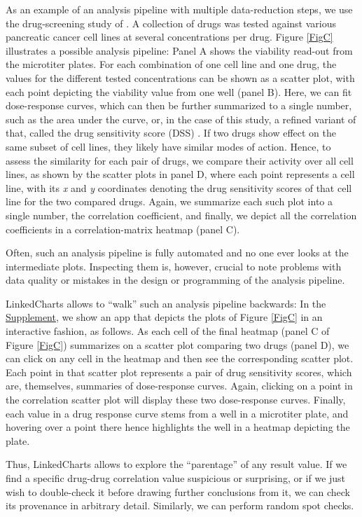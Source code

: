 \documentclass[twocolumn,10pt]{article}
\newcommand{\Supplement}{\href{https://anders-biostat.github.io/lc-paper/}{Supplement}}
\begin{document}
As an example of an analysis pipeline with multiple data-reduction steps, we use the drug-screening study of \citet{he_2018}. A collection of drugs was tested against various pancreatic cancer cell lines at several concentrations per drug. Figure \ref{FigC} illustrates a possible analysis pipeline: Panel A shows the viability read-out from the microtiter plates. For each combination of one cell line and one drug, the values for the different tested concentrations can be shown as a scatter plot, with each point depicting the viability value from one well (panel B). Here, we can fit dose-response curves, which can then be further summarized to a single number, such as the area under the curve, or, in the case of this study, a refined variant of that, called the drug sensitivity score (DSS) \citep{yadav_2014}. If two drugs show effect on the same subset of cell lines, they likely have similar modes of action. Hence, to assess the similarity for each pair of drugs, we compare their activity over all cell lines, as shown by the scatter plots in panel D, where each point represents a cell line, with its \emph{x} and \emph{y} coordinates denoting the drug sensitivity scores of that cell line for the two compared drugs. Again, we summarize each such plot into a single number, the correlation coefficient, and finally, we depict all the correlation coefficients in a correlation-matrix heatmap (panel C).

Often, such an analysis pipeline is fully automated and no one ever looks at the intermediate plots. Inspecting them is, however, crucial to note problems with data quality or mistakes in the design or programming of the analysis pipeline.

LinkedCharts allows to ``walk'' such an analysis pipeline backwards: In the \Supplement, we show an app that depicts the plots of Figure \ref{FigC} in an interactive fashion, as follows. As each cell of the final heatmap (panel C of Figure \ref{FigC}) summarizes on a scatter plot comparing two drugs (panel D), we can click on any cell in the heatmap and then see the corresponding scatter plot. Each point in that scatter plot represents a pair of drug sensitivity scores, which are, themselves, summaries of dose-response curves. Again, clicking on a point in the correlation scatter plot will display these two dose-response curves. Finally, each value in a drug response curve stems from a well in a microtiter plate, and hovering over a point there hence highlights the well in a heatmap depicting the plate.

Thus, LinkedCharts allows to explore the ``parentage'' of any result value. If we find a specific drug-drug correlation value suspicious or surprising, or if we just wish to double-check it before drawing further conclusions from it, we can check its provenance in arbitrary detail. Similarly, we can perform random spot checks. 
\end{document}
